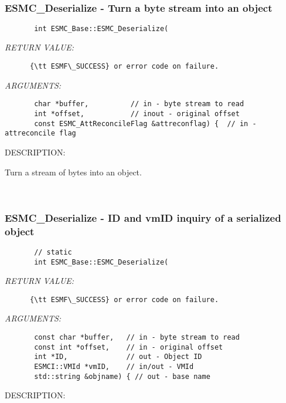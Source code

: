 \mbox{}\hrulefill\
 
\subsubsection [ESMC\_Deserialize] {ESMC\_Deserialize - Turn a byte stream into an object}


  
\begin{verbatim}       int ESMC_Base::ESMC_Deserialize(\end{verbatim}{\em RETURN VALUE:}
\begin{verbatim}      {\tt ESMF\_SUCCESS} or error code on failure.\end{verbatim}{\em ARGUMENTS:}
\begin{verbatim}       char *buffer,          // in - byte stream to read
       int *offset,           // inout - original offset
       const ESMC_AttReconcileFlag &attreconflag) {  // in - attreconcile flag\end{verbatim}
{\sf DESCRIPTION:\\ }


      Turn a stream of bytes into an object.
   
 
\mbox{}\hrulefill\
 
\subsubsection [ESMC\_Deserialize] {ESMC\_Deserialize - ID and vmID inquiry of a serialized object}


  
\begin{verbatim}       // static
       int ESMC_Base::ESMC_Deserialize(\end{verbatim}{\em RETURN VALUE:}
\begin{verbatim}      {\tt ESMF\_SUCCESS} or error code on failure.\end{verbatim}{\em ARGUMENTS:}
\begin{verbatim}       const char *buffer,   // in - byte stream to read
       const int *offset,    // in - original offset
       int *ID,              // out - Object ID
       ESMCI::VMId *vmID,    // in/out - VMId
       std::string &objname) { // out - base name\end{verbatim}
{\sf DESCRIPTION:\\ }


